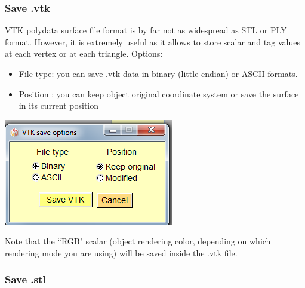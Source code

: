 \subsubsection{Save .vtk}
\begin{minipage}{0.5\textwidth}
VTK polydata surface file format is by far not as widespread as STL or PLY
format. However, it is extremely useful as it allows to store
scalar and tag values at each vertex or at each triangle.
Options:
\begin{itemize}
\item File type: you can save .vtk data in binary (little endian) or
ASCII formats.

\item Position : you can keep object original coordinate system
or save the surface in its current position
\end{itemize}
\end{minipage}    
\begin{minipage}{0.5\textwidth}\centering
  \includegraphics[scale=0.5]{images/File/Save_vtk.png}
 \end{minipage} 
\noindent
Note that the ``RGB" scalar (object rendering color, depending on which rendering mode you are
using) will be saved inside the .vtk file.


\subsubsection{Save .stl}

